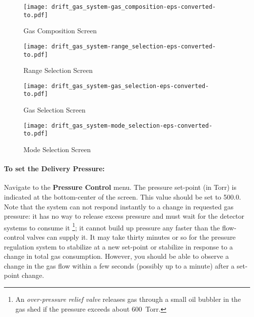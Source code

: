 \begin{center}
\begin{figure}[hbt]
\begin{minipage}{2.7in}
\texttt{[image: drift\_gas\_system-gas\_composition-eps-converted-to.pdf]}
\caption{Gas Composition Screen\label{fig:gas_composition}}
\end{minipage}
\begin{minipage}{2.7in}
\texttt{[image: drift\_gas\_system-range\_selection-eps-converted-to.pdf]}
\caption{Range Selection Screen\label{fig:range_selection}}
\end{minipage}
\end{figure}
\begin{figure}[hbt]
\begin{minipage}{2.7in}
\texttt{[image: drift\_gas\_system-gas\_selection-eps-converted-to.pdf]}
\caption{Gas Selection Screen\label{fig:gas_selection}}
\end{minipage}
\begin{minipage}{2.7in}
\texttt{[image: drift\_gas\_system-mode\_selection-eps-converted-to.pdf]}
\caption{Mode Selection Screen\label{fig:mode_selection}}
\end{minipage}
\end{figure}
\end{center}

\paragraph{To set the Delivery Pressure:}

Navigate to the {\bf Pressure Control} menu. The pressure set-point (in
Torr) is indicated at the bottom-center of the screen. This value
should be set to 500.0. Note that the system can not respond instantly
to a change in requested gas pressure: it has no way to release excess
pressure and must wait for the detector systems to consume it
\footnote{An \emph{over-pressure relief valve} releases gas through a
small oil bubbler in the gas shed if the pressure exceeds about
600~Torr.}; it cannot build up pressure any faster than the
flow-control valves can supply it. It may take thirty minutes or so
for the pressure regulation system to stabilize at a new set-point or
stabilize in response to a change in total gas consumption. However,
you should be able to observe a change in the gas flow within a few
seconds (possibly up to a minute) after a set-point change.

